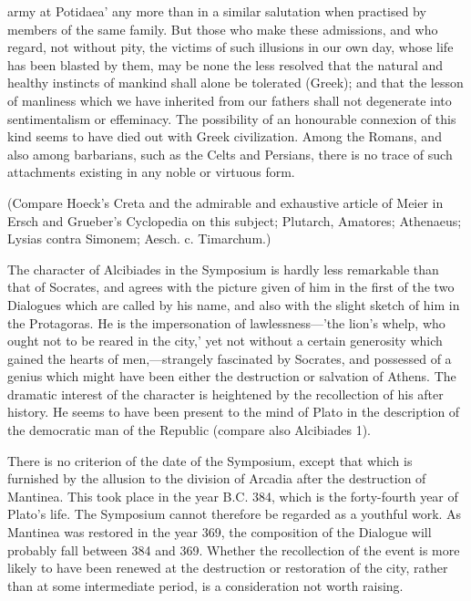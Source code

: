 \documentclass[11pt,letter]{article}
\begin{document}
army at Potidaea' any more than in a similar salutation when practised by members of the same family. But those who make these admissions, and who regard, not without pity, the victims of such illusions in our own day, whose life has been blasted by them, may be none the less resolved that the natural and healthy instincts of mankind shall alone be tolerated (Greek); and that the lesson of manliness which we have inherited from our fathers shall not degenerate into sentimentalism or effeminacy. The possibility of an honourable connexion of this kind seems to have died out with Greek civilization. Among the Romans, and also among barbarians, such as the Celts and Persians, there is no trace of such attachments existing in any noble or virtuous form.

\par  (Compare Hoeck's Creta and the admirable and exhaustive article of Meier in Ersch and Grueber's Cyclopedia on this subject; Plutarch, Amatores; Athenaeus; Lysias contra Simonem; Aesch. c. Timarchum.)

\par  The character of Alcibiades in the Symposium is hardly less remarkable than that of Socrates, and agrees with the picture given of him in the first of the two Dialogues which are called by his name, and also with the slight sketch of him in the Protagoras. He is the impersonation of lawlessness—'the lion's whelp, who ought not to be reared in the city,' yet not without a certain generosity which gained the hearts of men,—strangely fascinated by Socrates, and possessed of a genius which might have been either the destruction or salvation of Athens. The dramatic interest of the character is heightened by the recollection of his after history. He seems to have been present to the mind of Plato in the description of the democratic man of the Republic (compare also Alcibiades 1).

\par  There is no criterion of the date of the Symposium, except that which is furnished by the allusion to the division of Arcadia after the destruction of Mantinea. This took place in the year B.C. 384, which is the forty-fourth year of Plato's life. The Symposium cannot therefore be regarded as a youthful work. As Mantinea was restored in the year 369, the composition of the Dialogue will probably fall between 384 and 369. Whether the recollection of the event is more likely to have been renewed at the destruction or restoration of the city, rather than at some intermediate period, is a consideration not worth raising.
\end{document}

